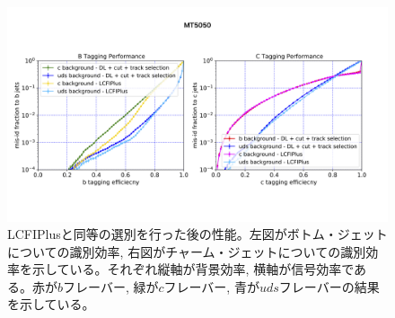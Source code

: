 \begin{figure}[htbp]
 \centering
 \includegraphics[trim = 0 150 0 200, width=1.0\textwidth, clip]{Figure/5Comparison/5-2-3-2FlavorTaggingROCCurve.png}
 \caption[LCFIPlusと同等の選別を行った後の性能]{LCFIPlusと同等の選別を行った後の性能。左図がボトム・ジェットについての識別効率, 右図がチャーム・ジェットについての識別効率を示している。それぞれ縦軸が背景効率, 横軸が信号効率である。赤が$b$フレーバー, 緑が$c$フレーバー, 青が$uds$フレーバーの結果を示している。}
 \label{5-2-3-2FlavorTaggingROCCurve}
\end{figure}










